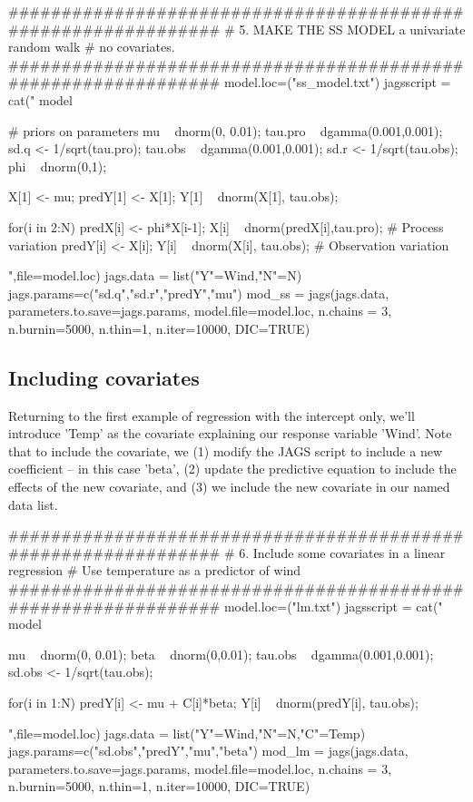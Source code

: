 \begin{Schunk}
\begin{Sinput}
 ###############################################################
 # 5. MAKE THE SS MODEL a univariate random walk
 # no covariates. 
 ###############################################################
 model.loc=("ss_model.txt")
 jagsscript = cat("
 model {  
    # priors on parameters
    mu ~ dnorm(0, 0.01); 
    tau.pro ~ dgamma(0.001,0.001); 
    sd.q <- 1/sqrt(tau.pro);
    tau.obs ~ dgamma(0.001,0.001);
    sd.r <- 1/sqrt(tau.obs); 
    phi ~ dnorm(0,1);
    
    X[1] <- mu;
    predY[1] <- X[1];
    Y[1] ~ dnorm(X[1], tau.obs);
 
    for(i in 2:N) {
       predX[i] <- phi*X[i-1]; 
       X[i] ~ dnorm(predX[i],tau.pro); # Process variation
       predY[i] <- X[i];
       Y[i] ~ dnorm(X[i], tau.obs); # Observation variation
    }
 }  
 ",file=model.loc)
 jags.data = list("Y"=Wind,"N"=N)
 jags.params=c("sd.q","sd.r","predY","mu")
 mod_ss = jags(jags.data, parameters.to.save=jags.params, model.file=model.loc, n.chains = 3, 
 n.burnin=5000, n.thin=1, n.iter=10000, DIC=TRUE)  
\end{Sinput}
\end{Schunk}

\subsection{Including covariates}\label{sec:covariates}

Returning to the first example of regression with the intercept only, we'll introduce 'Temp' as the covariate explaining our response variable 'Wind'. Note that to include the covariate, we (1) modify the JAGS script to include a new coefficient -- in this case 'beta', (2) update the predictive equation to include the effects of the new covariate, and (3) we include the new covariate in our named data list. 

\begin{Schunk}
\begin{Sinput}
 ###############################################################
 # 6. Include some covariates in a linear regression
 # Use temperature as a predictor of wind
 ###############################################################
 model.loc=("lm.txt")
 jagsscript = cat("
 model {  
    mu ~ dnorm(0, 0.01); 
    beta ~ dnorm(0,0.01);
    tau.obs ~ dgamma(0.001,0.001); 
    sd.obs <- 1/sqrt(tau.obs); 
    
    for(i in 1:N) {
       predY[i] <- mu + C[i]*beta; 
       Y[i] ~ dnorm(predY[i], tau.obs);
    }
 }  
 ",file=model.loc)
 jags.data = list("Y"=Wind,"N"=N,"C"=Temp)
 jags.params=c("sd.obs","predY","mu","beta")
 mod_lm = jags(jags.data, parameters.to.save=jags.params, 
         model.file=model.loc, n.chains = 3, n.burnin=5000, 
         n.thin=1, n.iter=10000, DIC=TRUE)  
\end{Sinput}
\end{Schunk}


